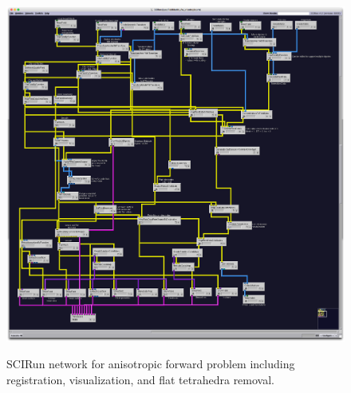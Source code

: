 \begin{figure}[p]
\begin{center}
\includegraphics[width=\textwidth]{Figures/aniso_network.png}\\
\caption{SCIRun network for anisotropic forward problem including registration, visualization, and flat tetrahedra removal.}
\label{fig:anisofornet}
\end{center}
\end{figure}

